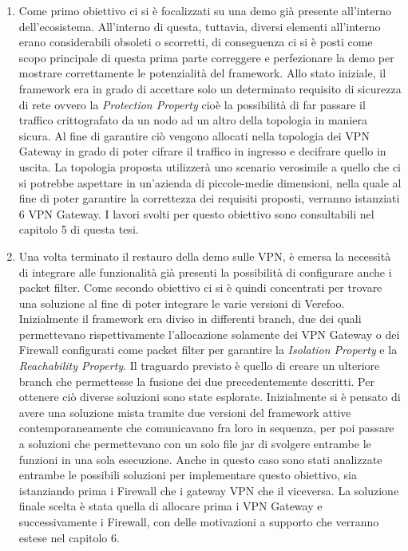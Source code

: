\begin{enumerate}
    \item Come primo obiettivo ci si è focalizzati su una demo già presente all'interno dell'ecosistema. All'interno di questa, tuttavia, diversi elementi all'interno erano considerabili obsoleti
        o scorretti, di conseguenza ci si è posti come scopo principale di questa prima parte correggere e perfezionare la demo per mostrare correttamente le potenzialità del framework.
        Allo stato iniziale, il framework era in grado di accettare solo un determinato requisito di sicurezza di rete ovvero
        la \textit{Protection Property} cioè la possibilità di far passare il traffico crittografato da un nodo ad un altro della topologia
        in maniera sicura. Al fine di garantire ciò vengono allocati nella topologia dei VPN Gateway in grado di poter cifrare il traffico in ingresso e decifrare quello in uscita.
        La topologia proposta utilizzerà uno scenario verosimile a quello che ci si potrebbe aspettare in un'azienda di piccole-medie dimensioni, nella quale al fine di poter garantire
        la correttezza dei requisiti proposti, verranno istanziati 6 VPN Gateway. I lavori svolti per questo obiettivo sono consultabili nel capitolo 5 di questa tesi.\newpage
    \item Una volta terminato il restauro della demo sulle VPN, è emersa la necessità di integrare alle funzionalità già presenti la possibilità di configurare anche i packet filter. Come secondo obiettivo ci si è quindi concentrati per trovare una soluzione al fine di poter integrare le varie versioni di Verefoo. 
        Inizialmente il framework era diviso in differenti branch, due dei quali permettevano rispettivamente l'allocazione solamente dei VPN Gateway o dei Firewall configurati come packet filter per garantire la \textit{Isolation Property} e la \textit{Reachability Property}.
        Il traguardo previsto è quello di creare un ulteriore branch che permettesse la fusione dei due precedentemente descritti. Per ottenere ciò diverse soluzioni sono state esplorate. Inizialmente si è pensato di avere una soluzione mista tramite due versioni del framework attive contemporaneamente che comunicavano fra loro in sequenza,
        per poi passare a soluzioni che permettevano con un solo file jar di svolgere entrambe le funzioni in una sola esecuzione. Anche in questo caso sono stati analizzate entrambe le possibili soluzioni per implementare questo obiettivo, sia istanziando prima i Firewall che i gateway VPN che il viceversa.
        La soluzione finale scelta è stata quella di allocare prima i VPN Gateway e successivamente i Firewall, con delle motivazioni a supporto che verranno estese nel capitolo 6.

\end{enumerate}
